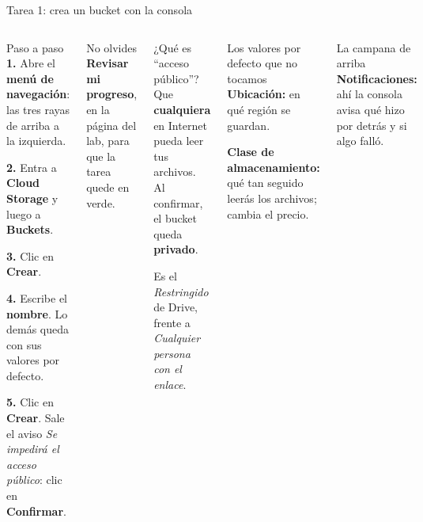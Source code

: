 \documentclass[aspectratio=169,10pt,c]{beamer}
\begin{document}
\begin{frame}{Tarea 1: crea un bucket con la consola}
\begin{columns}[T,onlytextwidth]
\begin{block}{Paso a paso}
\small
\textbf{1.} Abre el \textbf{menú de navegación}: las tres rayas de arriba a la izquierda.\par\smallskip
\textbf{2.} Entra a \textbf{Cloud Storage} y luego a \textbf{Buckets}.\par\smallskip
\textbf{3.} Clic en \textbf{Crear}.\par\smallskip
\textbf{4.} Escribe el \textbf{nombre}. Lo demás queda con sus valores por defecto.\par\smallskip
\textbf{5.} Clic en \textbf{Crear}. Sale el aviso \emph{Se impedirá el acceso público}: clic en \textbf{Confirmar}.
\end{block}
\begin{alertblock}{No olvides}
\small \textbf{Revisar mi progreso}, en la página del lab, para que la tarea quede en verde.
\end{alertblock}
\begin{exampleblock}{¿Qué es ``acceso público''?}
\small Que \textbf{cualquiera} en Internet pueda leer tus archivos. Al confirmar, el bucket queda \textbf{privado}.\par\smallskip
Es el \emph{Restringido} de Drive, frente a \emph{Cualquier persona con el enlace}.
\end{exampleblock}
\begin{block}{Los valores por defecto que no tocamos}
\footnotesize
\textbf{Ubicación:} en qué región se guardan.\par
\textbf{Clase de almacenamiento:} qué tan seguido leerás los archivos; cambia el precio.
\end{block}
\begin{block}{La campana de arriba}
\footnotesize \textbf{Notificaciones:} ahí la consola avisa qué hizo por detrás y si algo falló.
\end{block}
\end{columns}
\end{frame}
\end{document}
